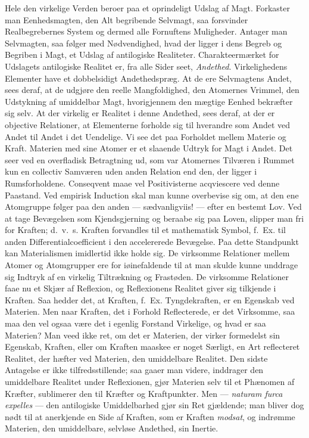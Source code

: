 \documentclass[12pt]{article}
\newcommand{\opage}[1]{\marginnote{\footnotesize\textit{[#1]}}}
\begin{document}
Hele den virkelige Verden beroer paa et oprindeligt Udslag af Magt.
Forkaster man Eenhedsmagten, den Alt begribende Selvmagt, saa
forsvinder Realbegrebernes System og dermed alle Fornuftens
Muligheder. Antager man Selvmagten, saa følger med Nødvendighed,
hvad der ligger i dens Begreb og Begriben i Magt, et Udslag af
antilogiske Realiteter. Charakteermærket for Udslagets antilogiske
Realitet er, fra alle Sider seet, \emph{Andethed}. Virkelighedens
Elementer have et dobbelsidigt Andethedspræg. At de ere Selvmagtens
Andet, sees deraf, at de udgjøre den reelle Mangfoldighed, den
Atomernes Vrimmel, den Udstykning af umiddelbar Magt, hvorigjennem
den mægtige Eenhed bekræfter sig selv. At der virkelig er Realitet i
denne Andethed, sees deraf, at der er objective Relationer, at
Elementerne forholde sig til hverandre som Andet ved Andet til Andet
i det Uendelige. Vi see det paa Forholdet mellem Materie og Kraft.
Materien med sine Atomer er et slaaende Udtryk for Magt i Andet. Det
seer ved en overfladisk Betragtning ud, som var Atomernes Tilværen i
Rummet kun en collectiv Samværen uden anden Relation end den, der
ligger i Rumsforholdene. Conseqvent maae vel Positivisterne
acqviescere ved denne Paastand. Ved empirisk Induction skal man
kunne overbevise sig om, at den ene Atomgruppe følger
\opage{40} paa den anden --- sædvanligviis! --- efter en bestemt Lov. Ved at
tage Bevægelsen som Kjendsgjerning og beraabe sig paa Loven, slipper
man fri for Kraften; d.\ v.\ s. Kraften forvandles til et
mathematisk Symbol, f.\ Ex. til anden Differentialcoefficient i den
accelererede Bevægelse. Paa dette Standpunkt kan Materialismen
imidlertid ikke holde sig. De virksomme Relationer mellem Atomer og
Atomgrupper ere for iøinefaldende til at man skulde kunne unddrage
sig Indtryk af en virkelig Tiltrækning og Frastøden. De virksomme
Relationer faae nu et Skjær af Reflexion, og Reflexionens Realitet
giver sig tilkjende i Kraften. Saa hedder det, at Kraften, f.\ Ex.
Tyngdekraften, er en Egenskab ved Materien. Men naar Kraften, det i
Forhold Reflecterede, er det Virksomme, saa maa den vel ogsaa være
det i egenlig Forstand Virkelige, og hvad er saa Materien? Man veed
ikke ret, om det er Materien, der virker formedelst sin Egenskab,
Kraften, eller om Kraften maaskee er noget Særligt, en Art
reflecteret Realitet, der hæfter ved Materien, den umiddelbare
Realitet. Den sidste Antagelse er ikke tilfredsstillende; saa gaaer
man videre, inddrager den umiddelbare Realitet under Reflexionen,
gjør Materien selv til et Phænomen af Kræfter, sublimerer den til
Kræfter og Kraftpunkter. Men --- \textit{naturam furca expelles}
--- den antilogiske Umiddelbarhed gjør sin Ret gjældende; man bliver
dog nødt til at anerkjende en Side af Kraften, som er Kraften
\emph{modsat}, og indrømme Materien, den umiddelbare, selvløse
Andethed, sin Inertie.
\end{document}
